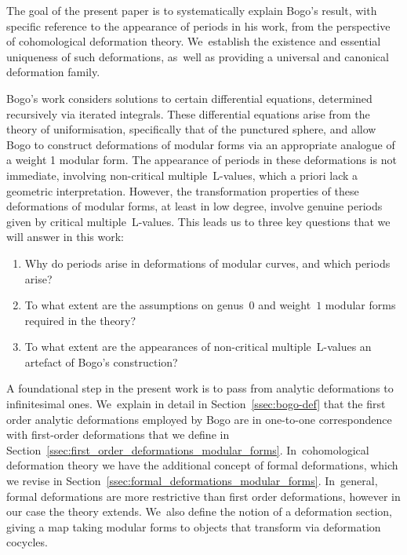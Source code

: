 \documentclass[JEP,XML,SOM,Unicode,published]{cedram}
\theoremstyle{plain}
\theoremstyle{definition}
\newcommand{\nbd}{\nobreakdash-\hspace{0pt}}
\newcommand{\rmL}{\ensuremath{\mathrm{L}}}
\begin{document}
The goal of the present paper is to systematically explain Bogo's result, with specific reference to the appearance of periods in his work, from the perspective of cohomological deformation theory. We~establish the existence and essential uniqueness of such deformations, as~well as providing a universal and canonical deformation family.

Bogo's work considers solutions to certain differential equations, determined recursively via iterated integrals. These differential equations arise from the theory of uniformisation, specifically that of the punctured sphere, and allow Bogo to construct deformations of modular forms via an appropriate analogue of a weight 1 modular form. The appearance of periods in these deformations is not immediate, involving non-critical multiple~$\rmL$\nbd{}values, which a priori lack a geometric interpretation. However, the transformation properties of these deformations of modular forms, at least in low degree, involve genuine periods given by critical multiple~$\rmL$\nbd{}values. This leads us to three key questions that we will answer in this work:
\begin{enumerate}\renewcommand{\theenumi}{Q\arabic{enumi}}
\item
\label{it:mainquestion:why_what_periods}
Why do periods arise in deformations of modular curves, and which periods arise?
\item
\label{it:mainquestion:restrictions}
To what extent are the assumptions on genus~$0$ and weight~$1$ modular forms required in the theory?
\item
\label{it:mainquestion:non_critical}
To what extent are the appearances of non-critical multiple~$\rmL$-values an artefact of Bogo's construction?
\end{enumerate}

A foundational step in the present work is to pass from analytic deformations to infinitesimal ones. We~explain in detail in Section~\ref{ssec:bogo-def} that the first order analytic deformations employed by Bogo are in one-to-one correspondence with first-order deformations that we define in Section~\ref{ssec:first_order_deformations_modular_forms}. In~cohomological deformation theory we have the additional concept of formal deformations, which we revise in Section~\ref{ssec:formal_deformations_modular_forms}. In~general, formal deformations are more restrictive than first order deformations, however in our case the theory extends. We~also define the notion of a deformation section, giving a map taking modular forms to objects that transform via deformation cocycles.
\end{document}
